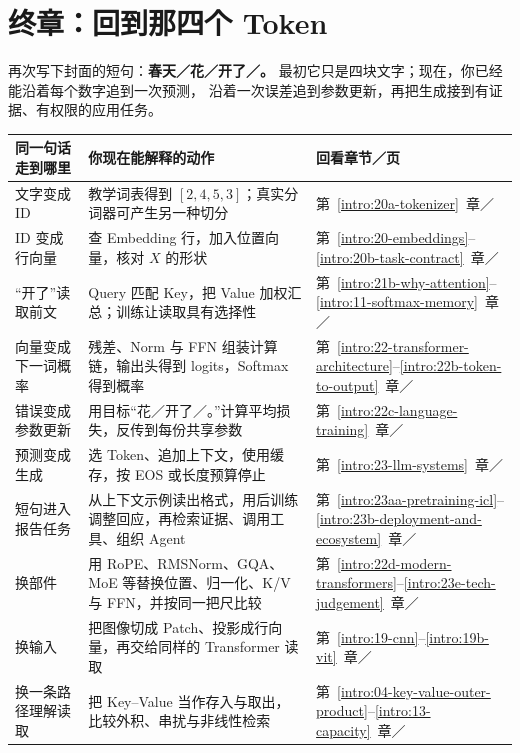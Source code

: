 \section*{终章：回到那四个 Token}
\label{sec:foundation-recap}

再次写下封面的短句：\textbf{春天／花／开了／。}
最初它只是四块文字；现在，你已经能沿着每个数字追到一次预测，
沿着一次误差追到参数更新，再把生成接到有证据、有权限的应用任务。

\begin{center}\small
\renewcommand{\arraystretch}{1.25}
\begin{tabularx}{\linewidth}{@{}>{\raggedright\arraybackslash}p{34mm}>{\raggedright\arraybackslash}X>{\raggedright\arraybackslash}p{31mm}@{}}
\toprule
同一句话走到哪里 & 你现在能解释的动作 & 回看章节／页\\\midrule
文字变成 ID & 教学词表得到 $[2,4,5,3]$；真实分词器可产生另一种切分 & 第~\ref*{intro:20a-tokenizer}~章／\pageref*{intro:20a-tokenizer}\\
ID 变成行向量 & 查 Embedding 行，加入位置向量，核对 $X$ 的形状 & 第~\ref*{intro:20-embeddings}--\ref*{intro:20b-task-contract}~章／\pageref*{intro:20-embeddings}\\
“开了”读取前文 & Query 匹配 Key，把 Value 加权汇总；训练让读取具有选择性 & 第~\ref*{intro:21b-why-attention}--\ref*{intro:11-softmax-memory}~章／\pageref*{intro:21b-why-attention}\\
向量变成下一词概率 & 残差、Norm 与 FFN 组装计算链，输出头得到 logits，Softmax 得到概率 & 第~\ref*{intro:22-transformer-architecture}--\ref*{intro:22b-token-to-output}~章／\pageref*{intro:22-transformer-architecture}\\
错误变成参数更新 & 用目标“花／开了／。”计算平均损失，反传到每份共享参数 & 第~\ref*{intro:22c-language-training}~章／\pageref*{intro:22c-language-training}\\
预测变成生成 & 选 Token、追加上下文，使用缓存，按 EOS 或长度预算停止 & 第~\ref*{intro:23-llm-systems}~章／\pageref*{intro:23-llm-systems}\\
短句进入报告任务 & 从上下文示例读出格式，用后训练调整回应，再检索证据、调用工具、组织 Agent & 第~\ref*{intro:23aa-pretraining-icl}--\ref*{intro:23b-deployment-and-ecosystem}~章／\pageref*{intro:23aa-pretraining-icl}\\
换部件 & 用 RoPE、RMSNorm、GQA、MoE 等替换位置、归一化、K/V 与 FFN，并按同一把尺比较 & 第~\ref*{intro:22d-modern-transformers}--\ref*{intro:23e-tech-judgement}~章／\pageref*{intro:22d-modern-transformers}\\
换输入 & 把图像切成 Patch、投影成行向量，再交给同样的 Transformer 读取 & 第~\ref*{intro:19-cnn}--\ref*{intro:19b-vit}~章／\pageref*{intro:19-cnn}\\
换一条路径理解读取 & 把 Key--Value 当作存入与取出，比较外积、串扰与非线性检索 & 第~\ref*{intro:04-key-value-outer-product}--\ref*{intro:13-capacity}~章／\pageref*{intro:04-key-value-outer-product}\\
\bottomrule
\end{tabularx}
\end{center}

